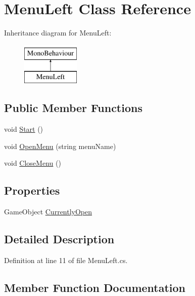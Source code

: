 \hypertarget{class_menu_left}{}\section{Menu\+Left Class Reference}
\label{class_menu_left}
Inheritance diagram for Menu\+Left\+:\begin{figure}[H]
\begin{center}
\leavevmode
\includegraphics[height=2.000000cm]{class_menu_left}
\end{center}
\end{figure}
\subsection*{Public Member Functions}
\begin{DoxyCompactItemize}
\item 
void \hyperlink{class_menu_left_af0a3f04327b3d529fa3609ffe2087906}{Start} ()
\item 
void \hyperlink{class_menu_left_af496f320115faf9206952beceae0028c}{Open\+Menu} (string menu\+Name)
\item 
void \hyperlink{class_menu_left_ae7e799e88f618df966837d538b122ca9}{Close\+Menu} ()
\end{DoxyCompactItemize}
\subsection*{Properties}
\begin{DoxyCompactItemize}
\item 
Game\+Object \hyperlink{class_menu_left_a233fd4ceb820f73d304cc11afe6035f4}{Currently\+Open}
\end{DoxyCompactItemize}


\subsection{Detailed Description}


Definition at line 11 of file Menu\+Left.\+cs.



\subsection{Member Function Documentation}
\mbox{\label{class_menu_left_ae7e799e88f618df966837d538b122ca9}} 
